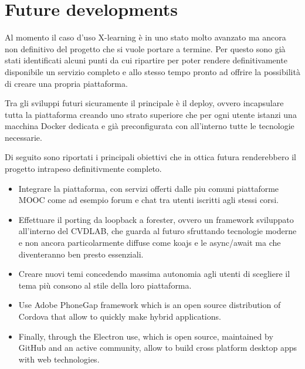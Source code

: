 \section{Future developments}
\label{sec:future_developments}

Al momento il caso d'uso X-learning è in uno stato molto avanzato ma ancora non definitivo del progetto che si vuole portare a termine.
Per questo sono già stati identificati alcuni punti da cui ripartire per poter rendere definitivamente disponibile un servizio completo e allo stesso tempo pronto ad offrire la possibilità di creare una propria piattaforma.

Tra gli sviluppi futuri sicuramente il principale è il deploy, ovvero incapsulare tutta la piattaforma creando uno strato superiore che per ogni utente istanzi una macchina Docker dedicata e già preconfigurata con all'interno tutte le tecnologie necessarie.

Di seguito sono riportati i principali obiettivi che in ottica futura renderebbero il progetto intrapeso definitivmente completo.

\begin{itemize}
  \item Integrare la piattaforma, con servizi offerti dalle piu comuni piattaforme MOOC come ad esempio forum e chat tra utenti iscritti agli stessi corsi.

  \item Effettuare il porting da loopback a forester, ovvero un framework sviluppato all'interno del CVDLAB, che guarda al futuro sfruttando tecnologie moderne e non ancora particolarmente diffuse come koajs e le async/await ma che diventeranno ben presto essenziali. 

  \item Creare nuovi temi concedendo massima autonomia agli utenti di scegliere il tema più consono al stile della loro piattaforma.

  \item Use Adobe PhoneGap framework which is an open source distribution of Cordova that allow to quickly make hybrid applications.

  \item Finally, through the Electron use, which is open source, maintained by GitHub and an active community, allow to build cross platform desktop apps with web technologies.\cite{electron}

\end{itemize}